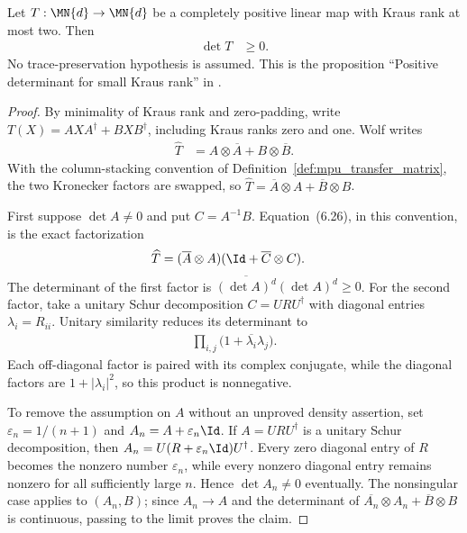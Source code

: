 \begin{theorem}
    \label{thm:wolf_positive_det_small_kraus_rank}
    \leanok
    Let $T:\MN{d}\to\MN{d}$ be a completely positive linear map with
    Kraus rank at most two. Then
    \begin{align}
        \det T
        &\geq0.
    \end{align}
    No trace-preservation hypothesis is assumed. This is the proposition
    ``Positive determinant for small Kraus rank'' in
    \cite[Chapter~6, Equation~(6.26)]{Wolf2012Quantum}.
\end{theorem}

\begin{proof}
    \leanok
    By minimality of Kraus rank and zero-padding, write
    $T(X)=AXA^\dagger+BXB^\dagger$, including Kraus ranks zero and one.
    Wolf writes
    \begin{align}
        \widehat T
        &=A\otimes\overline A+B\otimes\overline B.
    \end{align}
    With the column-stacking convention of
    Definition~\ref{def:mpu_transfer_matrix}, the two
    Kronecker factors are swapped, so
    $\widehat T=\overline A\otimes A+\overline B\otimes B$.

    First suppose $\det A\neq0$ and put $C=A^{-1}B$. Equation~(6.26), in
    this convention, is the exact factorization
    \begin{align}
        \widehat T
        &=(\overline A\otimes A)
          (\Id+\overline C\otimes C).
    \end{align}
    The determinant of the first factor is
    $\overline{(\det A)^d}(\det A)^d\geq0$.
    For the second factor, take a unitary Schur decomposition
    $C=URU^\dagger$ with diagonal entries $\lambda_i=R_{ii}$. Unitary
    similarity reduces its determinant to
    \begin{align}
        \prod_{i,j}
        \bigl(1+\overline{\lambda_i}\lambda_j\bigr).
    \end{align}
    Each off-diagonal factor is paired with its complex conjugate, while the
    diagonal factors are $1+|\lambda_i|^2$, so this product is nonnegative.

    To remove the assumption on $A$ without an unproved density assertion,
    set $\varepsilon_n=1/(n+1)$ and $A_n=A+\varepsilon_n\Id$. If
    $A=URU^\dagger$ is a unitary Schur decomposition, then
    $A_n=U(R+\varepsilon_n\Id)U^\dagger$. Every zero diagonal entry of $R$
    becomes the nonzero number $\varepsilon_n$, while every nonzero diagonal
    entry remains nonzero for all sufficiently large $n$. Hence
    $\det A_n\neq0$ eventually. The nonsingular case applies to $(A_n,B)$;
    since $A_n\to A$ and the determinant of
    $\overline{A_n}\otimes A_n+\overline B\otimes B$ is continuous, passing
    to the limit proves the claim.
\end{proof}

